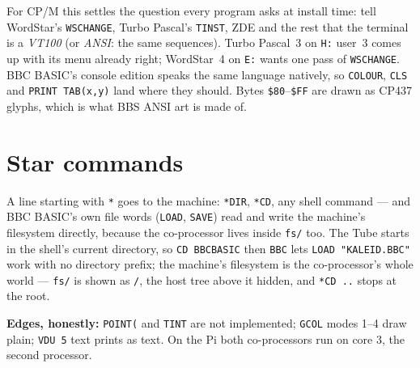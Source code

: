 
For CP/M this settles the question every program asks at install time:
tell WordStar's \texttt{WSCHANGE}, Turbo Pascal's \texttt{TINST}, ZDE and
the rest that the terminal is a \emph{VT100} (or \emph{ANSI}: the same
sequences). Turbo Pascal~3 on \texttt{H:} user~3 comes up with its menu
already right; WordStar~4 on \texttt{E:} wants one pass of
\texttt{WSCHANGE}. BBC BASIC's console edition speaks the same language
natively, so \verb|COLOUR|, \verb|CLS| and \verb|PRINT TAB(x,y)| land
where they should. Bytes \texttt{\$80}--\texttt{\$FF} are drawn as CP437
glyphs, which is what BBS ANSI art is made of.

\section{Star commands}
A line starting with \verb|*| goes to the machine: \verb|*DIR|, \verb|*CD|,
any shell command --- and BBC BASIC's own file words (\verb|LOAD|,
\verb|SAVE|) read and write the machine's filesystem directly, because the
co-processor lives inside \texttt{fs/} too. The Tube starts in the shell's
current directory, so \verb|CD BBCBASIC| then \verb|BBC| lets
\verb|LOAD "KALEID.BBC"| work with no directory prefix; the machine's
filesystem is the co-processor's whole world --- \texttt{fs/} is shown as
\texttt{/}, the host tree above it hidden, and \verb|*CD ..| stops at the
root.

\begin{aside}
\textbf{Edges, honestly:} \texttt{POINT(} and \texttt{TINT} are not
implemented; \texttt{GCOL} modes 1--4 draw plain; \texttt{VDU 5} text
prints as text. On the Pi both co-processors run on core 3, the
second processor.
\end{aside}
